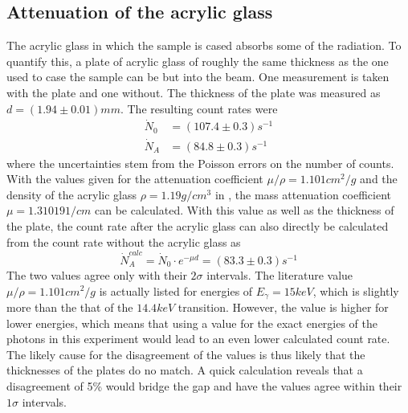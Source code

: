 \subsection{Attenuation of the acrylic glass}
The acrylic glass in which the sample is cased absorbs some of the radiation. To quantify this, a plate of acrylic glass of roughly the same thickness as the one used to case the sample can be but into the beam. One measurement is taken with the plate and one without. The thickness of the plate was measured as $d=\unit{(1.94\pm0.01)}{mm}$. The resulting count rates were
\begin{align}
\dot{N}_0&=\unit{(107.4\pm0.3)}{s^{-1}}\\
\dot{N}_A&=\unit{(84.8\pm0.3)}{s^{-1}}
\end{align}
where the uncertainties stem from the Poisson errors on the number of counts. With the values given for the attenuation coefficient $\mu/\rho=\unit{1.101}{cm^2/g}$ and the density of the acrylic glass $\rho=\unit{1.19}{g/cm^3}$ in \cite{anleitung}, the mass attenuation coefficient $\mu=\unit{1.31019}{1/cm}$ can be calculated. With this value as well as the thickness of the plate, the count rate after the acrylic glass can also directly be calculated from the count rate without the acrylic glass as
\begin{equation}
\dot{N}_A^{calc}=\dot{N}_0\cdot e^{-\mu d}=\unit{(83.3\pm0.3)}{s^{-1}}
\end{equation}
The two values agree only with their $2\sigma$ intervals. The literature value $\mu/\rho=\unit{1.101}{cm^2/g}$ is actually listed for energies of $E_\gamma=\unit{15}{keV}$, which is slightly more than the that of the $\unit{14.4}{keV}$ transition. However, the value is higher for lower energies, which means that using a value for the exact energies of the photons in this experiment would lead to an even lower calculated count rate. The likely cause for the disagreement of the values is thus likely that the thicknesses of the plates do no match. A quick calculation reveals that a disagreement of 5\% would bridge the gap and have the values agree within their $1\sigma$ intervals.